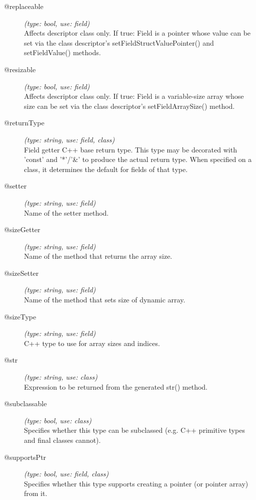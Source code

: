 \begin{description}
\item[@replaceable] \textit{(type: bool, use: field)} \\
  Affects descriptor class only. If true: Field is a pointer whose value can
  be set via the class descriptor's setFieldStructValuePointer() and
  setFieldValue() methods.

\item[@resizable] \textit{(type: bool, use: field)} \\
  Affects descriptor class only. If true: Field is a variable-size array whose
  size can be set via the class descriptor's setFieldArraySize() method.

\item[@returnType] \textit{(type: string, use: field, class)} \\
  Field getter C++ base return type. This type may be decorated with 'const'
  and '*'/'\&' to produce the actual return type. When specified on a class,
  it determines the default for fields of that type.

\item[@setter] \textit{(type: string, use: field)} \\
  Name of the setter method.

\item[@sizeGetter] \textit{(type: string, use: field)} \\
  Name of the method that returns the array size.

\item[@sizeSetter] \textit{(type: string, use: field)} \\
  Name of the method that sets size of dynamic array.

\item[@sizeType] \textit{(type: string, use: field)} \\
  C++ type to use for array sizes and indices.

\item[@str] \textit{(type: string, use: class)} \\
  Expression to be returned from the generated str() method.

\item[@subclassable] \textit{(type: bool, use: class)} \\
  Specifies whether this type can be subclassed (e.g. C++ primitive types and
  final classes cannot).

\item[@supportsPtr] \textit{(type: bool, use: field, class)} \\
  Specifies whether this type supports creating a pointer (or pointer array)
  from it.


\end{description}
